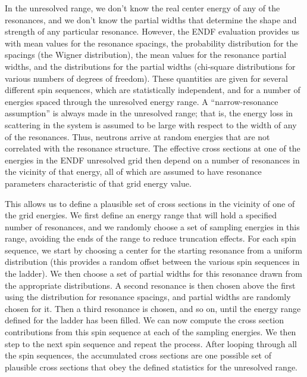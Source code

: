 In the unresolved range, we don't know the real center energy of any of
the resonances, and we don't know the partial widths that determine the
shape and strength of any particular resonance.  However, the ENDF
evaluation provides us with mean values for the resonance spacings,
the probability distribution for the spacings (the Wigner distribution),
 the mean values for the resonance partial
widths, and the distributions for the partial widths (chi-square
distributions for various numbers
of degrees of freedom).  These quantities are given for several
different spin sequences, which are statistically independent, and
for a number of energies spaced through the unresolved energy range.
A ``narrow-resonance assumption'' is always made in the unresolved
range; that is, the energy loss in scattering in the system is
assumed to be large with respect to the width of any of the resonances.
Thus, neutrons arrive at random energies that are not correlated
with the resonance structure.  The effective cross sections at one of
the energies in the ENDF unresolved grid then depend on a number of
resonances in the vicinity of that energy, all of which are assumed to
have resonance parameters characteristic of that grid energy value.

This allows us to define a plausible set of cross sections in the
vicinity of one of the grid energies.  We first define an energy range
that will hold a specified number of resonances, and we randomly
choose a set of sampling energies in this range, avoiding the
ends of the range to reduce truncation effects.  For each spin
sequence, we start by choosing a center for the starting resonance from
a uniform distribution (this provides a random offset between the
various spin sequences in the ladder).  We then choose a set of partial
widths for this resonance drawn from the appropriate distributions.
A second resonance is then chosen above the first using the distribution
for resonance spacings, and partial widths are randomly chosen for it.
Then a third resonance is chosen, and so on, until the energy range
defined for the ladder has been filled.  We can now compute the
cross section contributions from this spin sequence at each of the
sampling energies.  We then step to the next spin sequence and repeat
the process.  After looping through all the spin sequences, the
accumulated cross sections are one possible set of plausible cross
sections that obey the defined statistics for the unresolved range.

